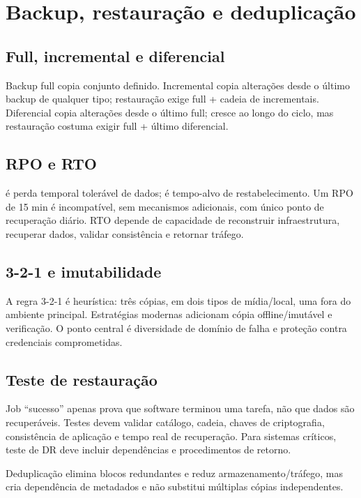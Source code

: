\section{Backup, restauração e deduplicação}

\subsection{Full, incremental e diferencial}

Backup full copia conjunto definido. Incremental copia alterações desde o último backup de qualquer tipo; restauração exige full + cadeia de incrementais. Diferencial copia alterações desde o último full; cresce ao longo do ciclo, mas restauração costuma exigir full + último diferencial.

\subsection{RPO e RTO}

 é perda temporal tolerável de dados;  é tempo-alvo de restabelecimento. Um RPO de 15 min é incompatível, sem mecanismos adicionais, com único ponto de recuperação diário. RTO depende de capacidade de reconstruir infraestrutura, recuperar dados, validar consistência e retornar tráfego.

\subsection{3-2-1 e imutabilidade}

A regra 3-2-1 é heurística: três cópias, em dois tipos de mídia/local, uma fora do ambiente principal. Estratégias modernas adicionam cópia offline/imutável e verificação. O ponto central é diversidade de domínio de falha e proteção contra credenciais comprometidas.

\subsection{Teste de restauração}

Job ``sucesso'' apenas prova que software terminou uma tarefa, não que dados são recuperáveis. Testes devem validar catálogo, cadeia, chaves de criptografia, consistência de aplicação e tempo real de recuperação. Para sistemas críticos, teste de DR deve incluir dependências e procedimentos de retorno.

Deduplicação elimina blocos redundantes e reduz armazenamento/tráfego, mas cria dependência de metadados e não substitui múltiplas cópias independentes.

